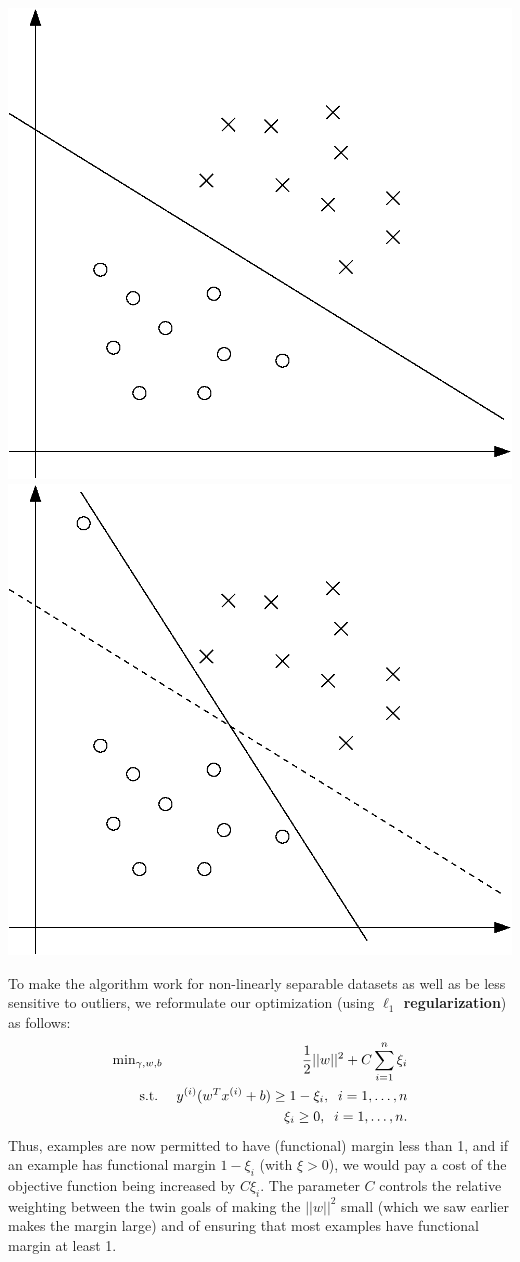 \documentclass{article}
\begin{document}
\begin{center}
	\includegraphics[width=.5\textwidth]{outlier.eps}\hfill
	\includegraphics[width=.5\textwidth]{outlier2.eps}
\end{center}

To make the algorithm work for non-linearly separable datasets as well as be less sensitive
to outliers, we reformulate our optimization (using {\bf $\ell_1$ regularization}) as follows:
\begin{eqnarray*}
&\hbox{min}_{\gamma,w,b}& \frac{1}{2} ||w||^2  + C \sum_{i=1}^{n} \xi_i \\
&\;\;\;\;\;\;\;\hbox{s.t.}& {y^{(i)}} (w^T{x^{(i)}} + b) \geq 1-\xi_i,\;\; i=1, \ldots, {n}  \\
&& \xi_i \geq 0, \;\; i=1,\ldots,{n}.
\end{eqnarray*}
Thus, examples are now permitted to have (functional) margin less than 1, and if an example
has functional margin $1-\xi_i$ (with $\xi > 0$), we would pay a cost of the objective function being
increased by $C\xi_i$.  The parameter $C$ controls the relative weighting between the
twin goals of making the $||w||^2$ small (which we saw earlier makes the margin large)
and of ensuring that most examples have functional margin at least 1.
\end{document}
